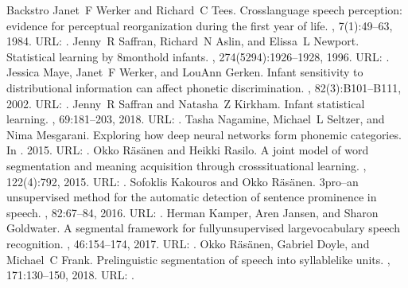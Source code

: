 \documentclass[letterpaper,10pt,english]{jupyterBook}
\begin{document}
\begin{sphinxthebibliography}{Backstro}
\sphinxAtStartPar
Janet F Werker and Richard C Tees. Cross\sphinxhyphen{}language speech perception: evidence for perceptual reorganization during the first year of life. , 7(1):49–63, 1984. URL: .
\sphinxAtStartPar
Jenny R Saffran, Richard N Aslin, and Elissa L Newport. Statistical learning by 8\sphinxhyphen{}month\sphinxhyphen{}old infants. , 274(5294):1926–1928, 1996. URL: .
\sphinxAtStartPar
Jessica Maye, Janet F Werker, and LouAnn Gerken. Infant sensitivity to distributional information can affect phonetic discrimination. , 82(3):B101–B111, 2002. URL: .
\sphinxAtStartPar
Jenny R Saffran and Natasha Z Kirkham. Infant statistical learning. , 69:181–203, 2018. URL: .
\sphinxAtStartPar
Tasha Nagamine, Michael L Seltzer, and Nima Mesgarani. Exploring how deep neural networks form phonemic categories. In . 2015. URL: .
\sphinxAtStartPar
Okko Räsänen and Heikki Rasilo. A joint model of word segmentation and meaning acquisition through cross\sphinxhyphen{}situational learning. , 122(4):792, 2015. URL: .
\sphinxAtStartPar
Sofoklis Kakouros and Okko Räsänen. 3pro–an unsupervised method for the automatic detection of sentence prominence in speech. , 82:67–84, 2016. URL: .
\sphinxAtStartPar
Herman Kamper, Aren Jansen, and Sharon Goldwater. A segmental framework for fully\sphinxhyphen{}unsupervised large\sphinxhyphen{}vocabulary speech recognition. , 46:154–174, 2017. URL: .
\sphinxAtStartPar
Okko Räsänen, Gabriel Doyle, and Michael C Frank. Pre\sphinxhyphen{}linguistic segmentation of speech into syllable\sphinxhyphen{}like units. , 171:130–150, 2018. URL: .

\end{sphinxthebibliography}
\end{document}
